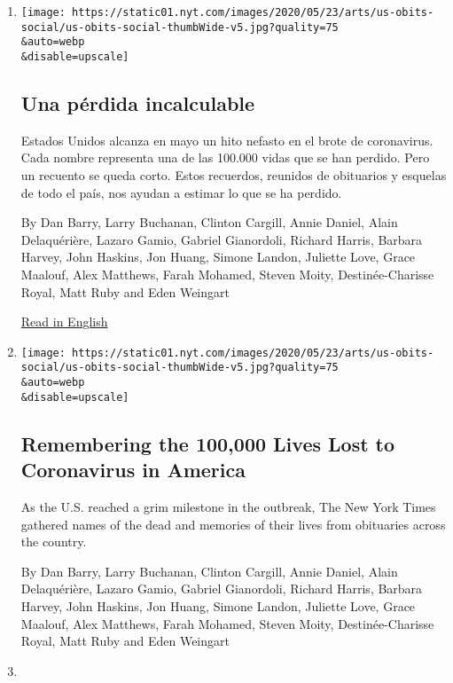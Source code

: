 \begin{enumerate}
\def\labelenumi{\arabic{enumi}.}
\item
  \href{/es/2020/05/26/espanol/mundo/100000-victimas-covid-estados-unidos.html}{}

  \texttt{[image: https://static01.nyt.com/images/2020/05/23/arts/us-obits-social/us-obits-social-thumbWide-v5.jpg?quality=75\\\&auto=webp\\\&disable=upscale]}

  \hypertarget{una-puxe9rdida-incalculable}{%
  \subsection{Una pérdida
  incalculable}\label{una-puxe9rdida-incalculable}}

  Estados Unidos alcanza en mayo un hito nefasto en el brote de
  coronavirus. Cada nombre representa una de las 100.000 vidas que se
  han perdido. Pero un recuento se queda corto. Estos recuerdos,
  reunidos de obituarios y esquelas de todo el país, nos ayudan a
  estimar lo que se ha perdido.

  By Dan Barry, Larry Buchanan, Clinton Cargill, Annie Daniel, Alain
  Delaquérière, Lazaro Gamio, Gabriel Gianordoli, Richard Harris,
  Barbara Harvey, John Haskins, Jon Huang, Simone Landon, Juliette Love,
  Grace Maalouf, Alex Matthews, Farah Mohamed, Steven Moity,
  Destinée-Charisse Royal, Matt Ruby and Eden Weingart

  \href{https://www.nytimes.com/interactive/2020/05/24/us/us-coronavirus-deaths-100000.html}{Read
  in English}
\item
  \href{/interactive/2020/05/24/us/us-coronavirus-deaths-100000.html}{}

  \texttt{[image: https://static01.nyt.com/images/2020/05/23/arts/us-obits-social/us-obits-social-thumbWide-v5.jpg?quality=75\\\&auto=webp\\\&disable=upscale]}

  \hypertarget{remembering-the-100000-lives-lost-to-coronavirus-in-america}{%
  \subsection{Remembering the 100,000 Lives Lost to Coronavirus in
  America}\label{remembering-the-100000-lives-lost-to-coronavirus-in-america}}

  As the U.S. reached a grim milestone in the outbreak, The New York
  Times gathered names of the dead and memories of their lives from
  obituaries across the country.

  By Dan Barry, Larry Buchanan, Clinton Cargill, Annie Daniel, Alain
  Delaquérière, Lazaro Gamio, Gabriel Gianordoli, Richard Harris,
  Barbara Harvey, John Haskins, Jon Huang, Simone Landon, Juliette Love,
  Grace Maalouf, Alex Matthews, Farah Mohamed, Steven Moity,
  Destinée-Charisse Royal, Matt Ruby and Eden Weingart
\item
  \href{/interactive/2020/03/18/us/trump-coronavirus-statements-timeline.html}{}


\end{enumerate}
